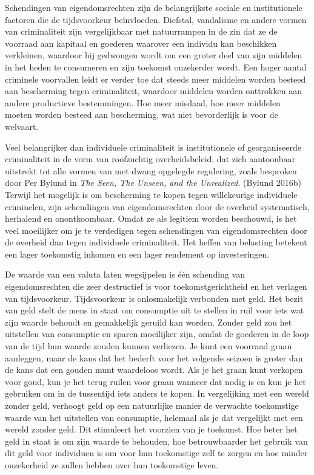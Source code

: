\documentclass[
  a5paper,
  smalldemyvopaper,11pt,twoside,onecolumn,openright,extrafontsizes,
hidelinks]{memoir}
\begin{document}
Schendingen van eigendomsrechten zijn de belangrijkste sociale en
institutionele factoren die de tijdsvoorkeur beïnvloeden. Diefstal,
vandalisme en andere vormen van criminaliteit zijn vergelijkbaar met
natuurrampen in de zin dat ze de voorraad aan kapitaal en goederen
waarover een individu kan beschikken verkleinen, waardoor hij gedwongen
wordt om een groter deel van zijn middelen in het heden te consumeren en
zijn toekomst onzekerder wordt. Een hoger aantal criminele voorvallen
leidt er verder toe dat steeds meer middelen worden besteed aan
bescherming tegen criminaliteit, waardoor middelen worden onttrokken aan
andere productieve bestemmingen. Hoe meer misdaad, hoe meer middelen
moeten worden besteed aan bescherming, wat niet bevorderlijk is voor de
welvaart.

Veel belangrijker dan individuele criminaliteit is institutionele of
georganiseerde criminaliteit in de vorm van roofzuchtig overheidsbeleid,
dat zich aantoonbaar uitstrekt tot alle vormen van met dwang opgelegde
regulering, zoals besproken door Per Bylund in \emph{The Seen, The
Unseen, and the Unrealized}. (Bylund 2016b) Terwijl het mogelijk is om
bescherming te kopen tegen willekeurige individuele criminelen, zijn
schendingen van eigendomsrechten door de overheid systematisch,
herhalend en onontkoombaar. Omdat ze als legitiem worden beschouwd, is
het veel moeilijker om je te verdedigen tegen schendingen van
eigendomsrechten door de overheid dan tegen individuele criminaliteit.
Het heffen van belasting betekent een lager toekomstig inkomen en een
lager rendement op investeringen.

De waarde van een valuta laten wegsijpelen is één schending van
eigendomsrechten die zeer destructief is voor toekomstgerichtheid en het
verlagen van tijdsvoorkeur. Tijdsvoorkeur is onlosmakelijk verbonden met
geld. Het bezit van geld stelt de mens in staat om consumptie uit te
stellen in ruil voor iets wat zijn waarde behoudt en gemakkelijk geruild
kan worden. Zonder geld zou het uitstellen van consumptie en sparen
moeilijker zijn, omdat de goederen in de loop van de tijd hun waarde
zouden kunnen verliezen. Je kunt een voorraad graan aanleggen, maar de
kans dat het bederft voor het volgende seizoen is groter dan de kans dat
een gouden munt waardeloos wordt. Als je het graan kunt verkopen voor
goud, kun je het terug ruilen voor graan wanneer dat nodig is en kun je
het gebruiken om in de tussentijd iets anders te kopen. In vergelijking
met een wereld zonder geld, verhoogt geld op een natuurlijke manier de
verwachte toekomstige waarde van het uitstellen van consumptie, helemaal
als je dat vergelijkt met een wereld zonder geld. Dit stimuleert het
voorzien van je toekomst. Hoe beter het geld in staat is om zijn waarde
te behouden, hoe betrouwbaarder het gebruik van dit geld voor individuen
is om voor hun toekomstige zelf te zorgen en hoe minder onzekerheid ze
zullen hebben over hun toekomstige leven.
\end{document}
